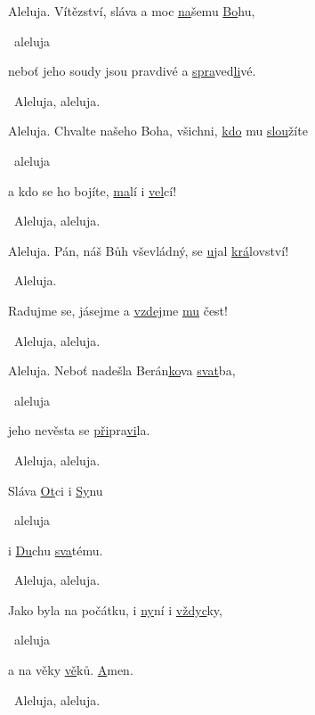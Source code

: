 \begin{psalmus}

Aleluja.
Vítězství, sláva a moc \underline{na}\-še\-mu \underline{Bo}\-hu, 

~aleluja

neboť jeho soudy jsou pravdivé a \underline{spra}\-ved\-\underline{li}\-vé.
 
~Aleluja, aleluja.\vspace{2mm}

Aleluja. 
Chvalte našeho Boha, všichni, \underline{kdo} mu \underline{slou}\-ží\-te 

~aleluja

a kdo se ho bojíte, \underline{ma}\-lí i \underline{vel}\-cí! 

~Aleluja, aleluja.\vspace{2mm}

Aleluja. 
Pán, náš Bůh vševládný, se \underline{u}\-jal \underline{krá}\-lov\-ství! 

~Aleluja.

Radujme se, jásejme a \underline{vzdej}\-me \underline{mu} čest! 

~Aleluja, aleluja.\vspace{2mm}

Aleluja. 
Neboť nadešla Be\-rán\-\underline{ko}\-va \underline{svat}\-ba, 

~aleluja

jeho nevěsta se \underline{při}\-pra\-\underline{vi}\-la. 

~Aleluja, aleluja.\vspace{2mm}

Sláva \underline{Ot}\-ci i \underline{Sy}\-nu 

~aleluja

i \underline{Du}\-chu \underline{sva}\-té\-mu.

~Aleluja, aleluja.\vspace{2mm}

Jako byla na počátku, i \underline{ny}\-ní i \underline{vždyc}\-ky, 

~aleluja

a na věky \underline{vě}\-ků. \underline{A}\-men.

~Aleluja, aleluja. 
\end{psalmus}
